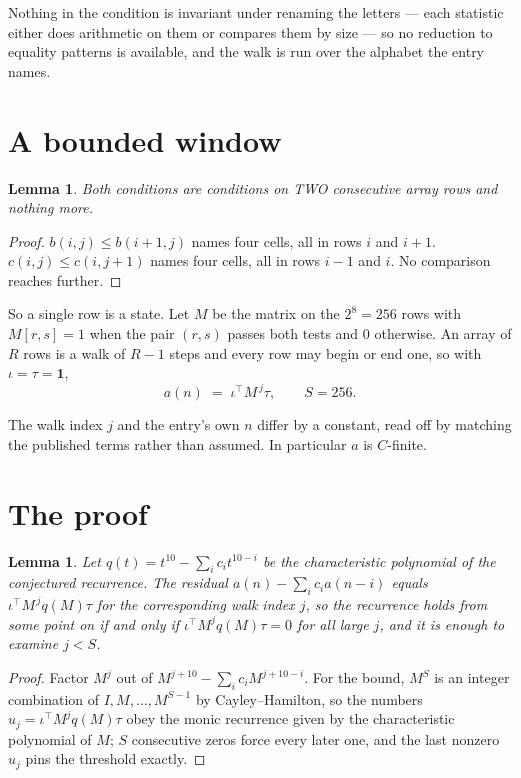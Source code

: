 \documentclass[11pt,a4paper]{article}
\theoremstyle{plain}
\newtheorem{lemma}[theorem]{Lemma}
\theoremstyle{definition}
\begin{document}
Nothing in the condition is invariant under renaming the letters --- each statistic either does
arithmetic on them or compares them by size --- so no reduction to equality patterns is
available, and the walk is run over the alphabet the entry names.

\section{A bounded window}

\begin{lemma}\label{lem:win}
Both conditions are conditions on TWO consecutive array rows and nothing more.
\end{lemma}

\begin{proof}
$b(i,j)\le b(i{+}1,j)$ names four cells, all in rows $i$ and $i+1$. $c(i,j)\le c(i,j{+}1)$
names four cells, all in rows $i-1$ and $i$. No comparison reaches further.
\end{proof}

So a single row is a state. Let $M$ be the matrix on the $2^{8}=256$ rows with
$M[r,s]=1$ when the pair $(r,s)$ passes both tests and $0$ otherwise. An array of $R$ rows is a
walk of $R-1$ steps and every row may begin or end one, so with $\iota=\tau=\mathbf{1}$,
\[
a(n)\;=\;\iota^{\!\top}M^{\,j}\tau ,\qquad S=256.
\]

The walk index $j$ and the entry's own $n$ differ by a constant, read off by matching the
published terms rather than assumed. In particular $a$ is $C$-finite.

\section{The proof}

\begin{lemma}\label{lem:crit}
Let $q(t)=t^{10}-\sum_i c_it^{10-i}$ be the characteristic polynomial of the
conjectured recurrence. The residual $a(n)-\sum_ic_ia(n-i)$ equals
$\iota^{\!\top}M^{\,j}q(M)\tau$ for the corresponding walk index $j$, so the recurrence
holds from some point on if and only if $\iota^{\!\top}M^{j}q(M)\tau=0$ for all large $j$,
and it is enough to examine $j<S$.
\end{lemma}

\begin{proof}
Factor $M^{j}$ out of $M^{j+10}-\sum_ic_iM^{j+10-i}$. For the bound, $M^{S}$
is an integer combination of $I,M,\dots,M^{S-1}$ by Cayley--Hamilton, so the numbers
$u_j=\iota^{\!\top}M^{j}q(M)\tau$ obey the monic recurrence given by the characteristic
polynomial of $M$; $S$ consecutive zeros force every later one, and the last nonzero $u_j$
pins the threshold exactly.
\end{proof}
\end{document}
